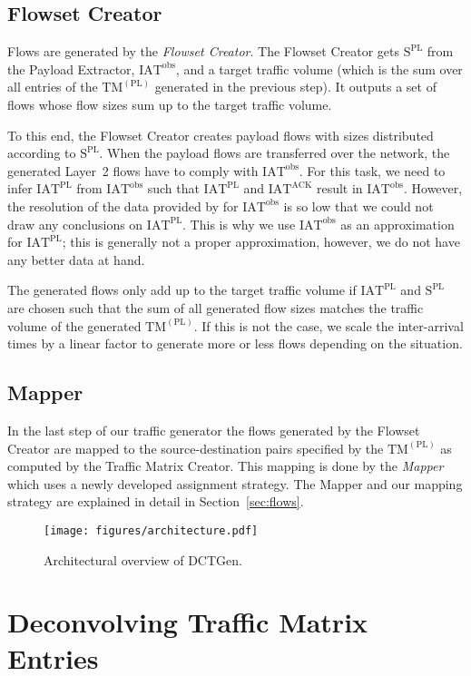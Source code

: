 \documentclass[journal,10pt]{IEEEtran}
\newcommand{\genname}{DCTGen}
\newcommand{\lt}{Layer~2}
\newcommand{\pltm}{\ensuremath{\mathrm{TM}^{(\mathrm{PL})}}}
\newcommand{\iat}[1] {\ensuremath{\mathrm{IAT}^{\mathrm{#1}}}}
\newcommand{\size}[1]{\ensuremath{\mathrm{S}  ^{\mathrm{#1}}}}
\begin{document}
\subsection{Flowset Creator}
Flows are generated by the \emph{Flowset Creator}.
The Flowset Creator gets \size{PL} from the Payload Extractor, \iat{obs}, and 
a target traffic volume (which is the sum over all entries of the \pltm{} generated in the previous step). 
It outputs a set of flows whose flow sizes sum up to the target traffic volume.


To this end, the Flowset Creator creates payload flows with sizes distributed according to \size{PL}.
When the payload flows are transferred over the network, the generated \lt{} flows have to comply with \iat{obs}.
For this task, we need to infer \iat{PL} from \iat{obs} such that \iat{PL} and \iat{ACK} result in \iat{obs}.
However, the resolution of the data provided by \cite{MSR-datacenters} for \iat{obs} is so low that we could not
draw any conclusions on \iat{PL}. This is why we use \iat{obs} as an approximation for \iat{PL}; this is generally not a 
proper approximation, however, we do not have any better data at hand.

The generated flows only add up to the target traffic volume if \iat{PL} and \size{PL}
are chosen such that the sum of all generated flow sizes matches the traffic volume of the generated \pltm{}.
If this is not the case, we scale the inter-arrival times by a linear factor to generate more or less flows depending on the situation.




\subsection{Mapper}
In the last step of our traffic generator the flows generated by the Flowset Creator are mapped to the source-destination pairs specified by the
\pltm{} as computed by the Traffic Matrix Creator. 
This mapping is done by the \emph{Mapper} which uses a newly developed assignment strategy. The Mapper 
and our mapping strategy are explained in detail in Section~\ref{sec:flows}.

\begin{figure}
	\texttt{[image: figures/architecture.pdf]}
	\caption{Architectural overview of \genname{}.}
	\label{fig:architecture}
\end{figure}

\section{Deconvolving Traffic Matrix Entries}
\label{sec:deconvolve}
\end{document}

